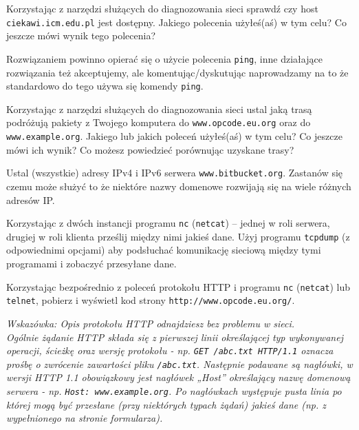 \dbEntryCheckResults
Korzystając z narzędzi służących do diagnozowania sieci sprawdź czy host \Verb#ciekawi.icm.edu.pl# jest dostępny.
Jakiego polecenia użyłeś(aś) w tym celu? Co jeszcze mówi wynik tego polecenia?

\begin{teacherOnly}
Rozwiązaniem powinno opierać się o użycie polecenia \Verb#ping#, inne działające rozwiązania też akceptujemy, ale komentując/dyskutując naprowadzamy na to że standardowo do tego używa się komendy \Verb#ping#.
\end{teacherOnly}
\fi

\dbEntryCheckResults
Korzystając z narzędzi służących do diagnozowania sieci ustal jaką trasą podróżują pakiety z Twojego komputera do \Verb#www.opcode.eu.org# oraz do \Verb#www.example.org#.
Jakiego lub jakich poleceń użyłeś(aś) w tym celu? Co jeszcze mówi ich wynik? Co możesz powiedzieć porównując uzyskane trasy?
\fi

\dbEntryCheckResults
Ustal (wszystkie) adresy IPv4 i IPv6 serwera \Verb#www.bitbucket.org#.
Zastanów się czemu może służyć to że niektóre nazwy domenowe rozwijają się na wiele różnych adresów IP.
\fi

\dbEntryCheckResults
Korzystając z dwóch instancji programu \Verb#nc# (\Verb#netcat#) – jednej w roli serwera, drugiej w roli klienta prześlij między nimi jakieś dane.
Użyj programu \Verb#tcpdump# (z odpowiednimi opcjami) aby podsłuchać komunikację sieciową między tymi programami i zobaczyć przesyłane dane.
\fi

\dbEntryCheckResults
Korzystając bezpośrednio z poleceń protokołu HTTP i programu \Verb#nc# (\Verb#netcat#) lub \Verb#telnet#, pobierz i wyświetl kod strony \Verb#http://www.opcode.eu.org/#.

\textit{Wskazówka:
	Opis protokołu HTTP odnajdziesz bez problemu w sieci.\\
	Ogólnie żądanie HTTP składa się z pierwszej linii określającej typ wykonywanej operacji, ścieżkę oraz wersję protokołu - np. \texttt{GET /abc.txt HTTP/1.1} oznacza prośbę o zwrócenie zawartości pliku \texttt{/abc.txt}.
	Następnie podawane są nagłówki, w wersji HTTP 1.1 obowiązkowy jest nagłówek „Host” określający nazwę domenową serwera - np. \texttt{Host: www.example.org}.
	Po nagłówkach występuje pusta linia po której mogą być przesłane (przy niektórych typach żądań) jakieś dane (np. z wypełnionego na stronie formularza).
}
\fi

